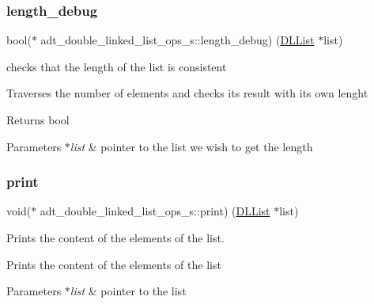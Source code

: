 \subsubsection{\texorpdfstring{length\+\_\+debug}{length\_debug}}
{\footnotesize\ttfamily bool($\ast$ adt\+\_\+double\+\_\+linked\+\_\+list\+\_\+ops\+\_\+s\+::length\+\_\+debug) (\hyperlink{structadt__double__linked__list__s}{D\+L\+List} $\ast$list)}



checks that the length of the list is consistent 

Traverses the number of elements and checks its result with its own lenght

\begin{DoxyReturn}{Returns}
bool 
\end{DoxyReturn}

\begin{DoxyParams}{Parameters}
{\em $\ast$list} & pointer to the list we wish to get the length \\
\hline
\end{DoxyParams}
\mbox{\label{structadt__double__linked__list__ops__s_ab6997d4fcadb176622405fece05d0f22}} 
\subsubsection{\texorpdfstring{print}{print}}
{\footnotesize\ttfamily void($\ast$ adt\+\_\+double\+\_\+linked\+\_\+list\+\_\+ops\+\_\+s\+::print) (\hyperlink{structadt__double__linked__list__s}{D\+L\+List} $\ast$list)}



Prints the content of the elements of the list. 

Prints the content of the elements of the list


\begin{DoxyParams}{Parameters}
{\em $\ast$list} & pointer to the list \\
\hline
\end{DoxyParams}
\mbox{\label{structadt__double__linked__list__ops__s_a849787a1e33fd60d783ba6176e8727dd}} 
